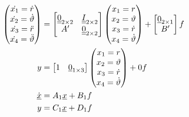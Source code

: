 \documentclass{article}
\begin{document}
        \begin{align}
			\begin{pmatrix}
				\dot{x_1} = \dot{r} \\
				\dot{x_2} = \dot{\vartheta} \\
				\dot{x_3} = \ddot{r} \\
				\dot{x_4} = \ddot{\vartheta}
			\end{pmatrix}
			& =
			\begin{bmatrix}
				\underline{\underline{0}}_{2 \times 2} & \underline{\underline{I}}_{2 \times 2} \\
				A' & \underline{\underline{0}}_{2 \times 2}
			\end{bmatrix}
			\begin{pmatrix}
				x_1 = r \\
				x_2 = \vartheta \\
				x_3 = \dot{r} \\
				x_4 = \dot{\vartheta}
			\end{pmatrix}
			+
			\begin{bmatrix}
				\underline{0}_{2 \times 1} \\
				B'
			\end{bmatrix}
			f \\
			y & =
			\begin{bmatrix}
				1 & \underline{0}_{1 \times 3} 
			\end{bmatrix}
			\begin{pmatrix}
				x_1 = r \\
				x_2 = \vartheta \\
				x_3 = \dot{r} \\
				x_4 = \dot{\vartheta}
			\end{pmatrix}
			+
			0f \\
			\dot{\underline{x}} & = A_1 \underline{x} + B_1 f \\
			y & = C_1 \underline{x} + D_1f
		\end{align}
\end{document}
